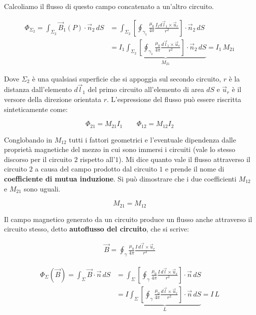 Calcoliamo il flusso di questo campo concatenato a un'altro circuito.

\begin{equation*}
	\begin{aligned}
		\Phi_{\Sigma_2}=\int_{\Sigma_2} \vec{B}_1(P)\cdot \vec{n}_2\,dS &= \int_{\Sigma_2} \left[ \oint_{\gamma_1} \frac{\mu_0}{4\pi}\frac{I_1d\vec{l}_1\times \vec{u}_r}{r^2} \right] \cdot \vec{n}_2 \,dS \\
		&= I_1 \underbrace{\int_{\Sigma_2} \left[ \oint_{\gamma_1} \frac{\mu_0}{4\pi}\frac{d\vec{l}_1\times \vec{u}_r}{r^2} \right] \cdot \vec{n}_2 \,dS}_{M_{21}}  = I_1\,M_{21}
	\end{aligned}
\end{equation*}

Dove $\Sigma_2$ è una qualsiasi superficie che si appoggia sul secondo circuito, $r$ è la distanza dall'elemento $d\vec{l}_1$ del primo circuito all'elemento di area $dS$ e $\vec{u}_r$ è il versore della direzione orientata $r$.
L'espressione del flusso può essere riscritta sinteticamente come:

\[
	\Phi_{21}=M_{21}I_1 \qquad \Phi_{12}=M_{12}I_2
\]

Conglobando in $M_{12}$ tutti i fattori geometrici e l'eventuale dipendenza dalle proprietà magnetiche del mezzo in cui sono immersi i circuiti (vale lo stesso discorso per il circuito $2$ rispetto all'$1$). Mi dice quanto vale il flusso attraverso il circuito $2$ a causa del campo prodotto dal circuito $1$ e prende il nome di \textbf{coefficiente di mutua induzione}. Si può dimostrare che i due coefficienti $M_{12}$ e $M_{21}$ sono uguali.

\[
	M_{21}=M_{12}
\]

Il campo magnetico generato da un circuito produce un flusso anche attraverso il circuito stesso, detto \textbf{autoflusso del circuito}, che si scrive:

\begin{gather*}
	\vec{B} = \oint_{\gamma} \frac{\mu_0}{4\pi}\frac{I\,d\vec{l} \times \vec{u}_r}{r^2}
\end{gather*}

\begin{equation*}
	\begin{aligned}
		\Phi_{\Sigma}(\vec{B} ) = \int_{\Sigma}\vec{B} \cdot \vec{n} \,dS &= \int_{\Sigma} \left[ \oint_{\gamma} \frac{\mu_0}{4\pi}\frac{I\,d\vec{l} \times \vec{u}_r}{r^2} \right]   \cdot \vec{n} \,dS \\
		&= I \underbrace{\int_{\Sigma} \left[ \oint_{\gamma} \frac{\mu_0}{4\pi}\frac{d\vec{l} \times \vec{u}_r}{r^2} \right] \cdot \vec{n} \,dS}_L = I\,L
	\end{aligned}
\end{equation*}

